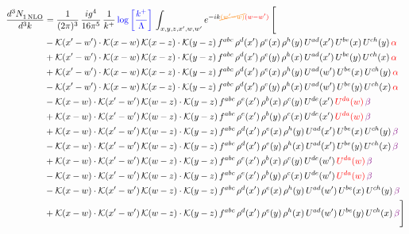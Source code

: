 \documentclass[9pt]{article}
\numberwithin{equation}{section}
\begin{document}
\begin{align}
  \frac{d^{3}N_{1\,\rm NLO}^{\rm}}{d^{3}k}  & = \frac{1}{(2\pi)^{3}}\, \frac{ig^{4}}{16\pi^{5}}\, \frac{1}{k^{+}}\, {\color{blue}\log{\left[\frac{k^{+}}{\Lambda}\right]}}\,\int_{x,y,z,x^{\prime},w,w^{\prime}}e^{-ik{\color{orange}\cancel{(w^{\prime}-w)}}{\color{red}(w-w^{\prime})}}\, \Bigg[\notag \\ & -\mathcal{K}(x'-w')\cdot\mathcal{K}(x-w)\,\mathcal{K}(x-z)\cdot\mathcal{K}(y-z)\, f^{abc}\,\rho^{d}(x')\,\rho^{e}(x)\,\rho^{h}(y)\,U^{ad}(x')\,U^{be}(x)\,U^{ch}(y)\,{\color{red}\alpha}\notag\\
&+\mathcal{K}(x'-w')\cdot\mathcal{K}(x-w)\,\mathcal{K}(x-z)\cdot\mathcal{K}(y-z)\, f^{abc}\,\rho^{d}(x')\,\rho^{e}(y)\,\rho^{h}(x)\,U^{ad}(x')\,U^{be}(y)\,U^{ch}(x)\,{\color{red}\alpha}\notag\\ & +\mathcal{K}(x'-w')\cdot\mathcal{K}(x-w)\,\mathcal{K}(x-z)\cdot\mathcal{K}(y-z)\, f^{abc}\,\rho^{d}(x')\,\rho^{e}(x)\,\rho^{h}(y)\,U^{ad}(w')\,U^{be}(x)\,U^{ch}(y)\,{\color{red}\alpha}\notag\\ & -\mathcal{K}(x'-w')\cdot\mathcal{K}(x-w)\,\mathcal{K}(x-z)\cdot\mathcal{K}(y-z)\, f^{abc}\,\rho^{d}(x')\,\rho^{e}(y)\,\rho^{h}(x)\,U^{ad}(w')\,U^{be}(y)\,U^{ch}(x)\,{\color{red}\alpha}\notag\\ & - \mathcal{K}(x-w) \cdot \mathcal{K}(x'-w')\, \mathcal{K}(w-z)\cdot \mathcal{K}(y-z)\, f^{abc}\, \rho^{e}(x')\,\rho^{b}(x)\,\rho^{c}(y)\,U^{de}(x')\,{\color{red}U^{da}(w)}\,{\color{violet} \beta} \notag \\ &  +  \mathcal{K}(x-w) \cdot \mathcal{K}(x'-w')\, \mathcal{K}(w-z)\cdot \mathcal{K}(y-z)\, f^{abc}\, \rho^{e}(x')\,\rho^{b}(y)\,\rho^{c}(x)\,U^{de}(x')\,{\color{red}U^{da}(w)}\,{\color{violet} \beta} \notag \\ & + \mathcal{K}(x-w) \cdot \mathcal{K}(x'-w')\, \mathcal{K}(w-z)\cdot \mathcal{K}(y-z)\, f^{abc}\, \rho^{d}(x')\,\rho^{e}(x)\,\rho^{h}(y)\,U^{ad}(x')\,U^{be}(x)\,U^{ch}(y)\, {\color{violet} \beta} \notag \\ & - \mathcal{K}(x-w) \cdot \mathcal{K}(x'-w')\, \mathcal{K}(w-z)\cdot \mathcal{K}(y-z)\, f^{abc}\, \rho^{d}(x')\,\rho^{e}(y)\,\rho^{h}(x)\,U^{ad}(x')\,U^{be}(y)\,U^{ch}(x)\, {\color{violet} \beta} \notag \\ & + \mathcal{K}(x-w) \cdot \mathcal{K}(x'-w')\, \mathcal{K}(w-z)\cdot \mathcal{K}(y-z)\, f^{abc}\, \rho^{e}(x')\,\rho^{b}(x)\,\rho^{c}(y)\,U^{de}(w')\,{\color{red}U^{da}(w)}\,{\color{violet} \beta} \notag \\ & - \mathcal{K}(x-w) \cdot \mathcal{K}(x'-w')\, \mathcal{K}(w-z)\cdot \mathcal{K}(y-z)\, f^{abc}\, \rho^{e}(x')\,\rho^{b}(y)\,\rho^{c}(x)\,U^{de}(w')\,{\color{red}U^{da}(w)}\, {\color{violet} \beta} \notag \\ & - \mathcal{K}(x-w) \cdot \mathcal{K}(x'-w')\, \mathcal{K}(w-z)\cdot \mathcal{K}(y-z)\, f^{abc}\, \rho^{d}(x')\,\rho^{e}(x)\,\rho^{h}(y)\,U^{ad}(w')\,U^{be}(x)\,U^{ch}(y)\, {\color{violet} \beta} \notag \\ & + \mathcal{K}(x-w) \cdot \mathcal{K}(x'-w')\, \mathcal{K}(w-z)\cdot \mathcal{K}(y-z)\, f^{abc}\, \rho^{d}(x')\,\rho^{e}(y)\,\rho^{h}(x)\,U^{ad}(w')\,U^{be}(y)\,U^{ch}(x)\, {\color{violet} \beta} \Bigg]
\end{align}
\end{document}
